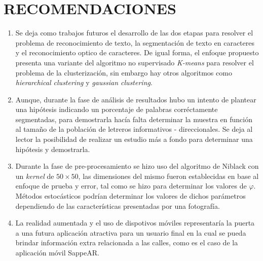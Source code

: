 \chapter*{RECOMENDACIONES}
\label{cap:trabajosfuturos}
\begin{enumerate}
	\item Se deja como trabajos futuros el desarrollo de las dos etapas para 
	resolver el problema de reconocimiento de texto, la segmentación de texto en
caracteres y el reconocimiento optico de caracteres. De igual forma, el enfoque
propuesto presenta una variante del algoritmo no supervisado \textit{K-means}
para resolver el problema de la clusterización, sin embargo hay otros algoritmos
como \textit{hierarchical clustering} y \textit{gaussian clustering}.%
	
	\item Aunque, durante la fase de análisis de resultados hubo un intento de 
	plantear una hipótesis indicando un porcentaje de palabras corréctamente
segmentadas, para demostrarla hacía falta determinar la muestra en función al
tamaño de la población de letreros informativos - direccionales. Se deja al
lector la posibilidad de realizar un estudio más a fondo para determinar una
hipótesis y demostrarla. 
	
	\item Durante la fase de pre-procesamiento se hizo uso del algoritmo de 
	Niblack con un \textit{kernel} de $50 \times 50$, las dimensiones del mismo
fueron establecidas en base al enfoque de prueba y error, tal como se hizo para
determinar los valores de $\varphi$. Métodos estocásticos podrían determinar los
valores de dichos parámetros dependiendo de las características presentadas por
una fotografía.

	\item La realidad aumentada y el uso de dispotivos móviles representaría la 
	puerta a una futura aplicación atractiva para un usuario final en la cual se
pueda brindar información extra relacionada a las calles, como es el caso de la
aplicación móvil SappeAR.\cite{Sappear:web}
\end{enumerate}
